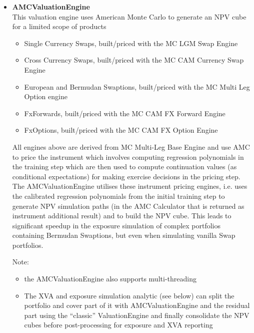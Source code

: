 \documentclass[12pt, a4paper]{report}
\begin{document}
\begin{itemize}
  (the evaluation date), builds a clone of the full market, builds a local scenario sim market, builds
  the respective sub-portfolio linked to the thread's local market, builds and runs the usual
  ValuationEngine; the engine then populates a ``mini netting set NPV cube'' for
  the sub-portfolio. Because the engine parallelises by splitting the portfolio and because market
  building causes a fixed computational overhead, we need a sufficiently large full portfolio and
  sufficiently large sub-portfolios to achieve a significant speed up with this approach, i.e.
  overall processing time not too far above the optimal limit of 1 / N times the
  single-threaded processing time.
\item {\bf AMCValuationEngine} \\
  This valuation engine uses American Monte Carlo to generate an NPV cube for a limited scope of
  products
  \begin{itemize}
  \item Single Currency Swaps, built/priced with the MC LGM Swap Engine
  \item Cross Currency Swaps, built/priced with the MC CAM Currency Swap Engine
  \item European and Bermudan Swaptions, built/priced with the MC Multi Leg Option engine
  \item FxForwards, built/priced with the MC CAM FX Forward Engine
  \item FxOptions, built/priced with the MC CAM FX Option Engine
  \end{itemize}
  All engines above are derived from MC Multi-Leg Base Engine and use AMC to price the instrument
  which involves computing regression polynomials in the training step which are then used to compute
  continuation values (as conditional expectations) for making exercise decisions in the pricing step.
  The AMCValuationEngine utilises these instrument pricing engines, i.e. uses the calibrated
  regression polynomials from the initial training step to generate NPV simulation paths (in the AMC
  Calculator that is returned as instrument additional result) and to build the NPV cube.
  This leads to significant speedup in the exposure simulation of complex portfolios containing
  Bermudan Swaptions, but even when simulating vanilla Swap portfolios.
  
  Note:
  \begin{itemize}
  \item the AMCValuationEngine also supports multi-threading
  \item The XVA and exposure simulation analytic (see below) can split the portfolio and cover part
    of it with AMCValuationEngine and the residual part using the ``classic'' ValuationEngine and
    finally consolidate the NPV cubes before post-processing for exposure and XVA reporting
  \end{itemize}

\end{itemize}
\end{document}
